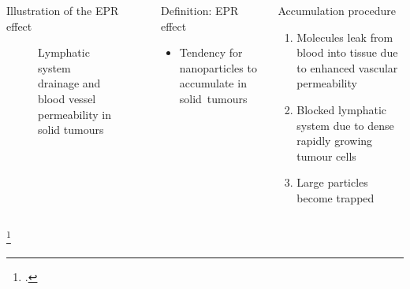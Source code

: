 \documentclass[aspectratio=169,compress]{beamer}
\newcommand*{\autotitle}{\subsecname\hfill\textbf{\small\secname}}
\begin{document}
\begin{frame}[fragile]{\autotitle}
\begin{columns}
\begin{block}{Illustration of the EPR effect}
\begin{figure}
          \caption{\textcolor{gold-palatinate}{Lymphatic system} drainage and \textcolor{red!80}{blood vessel} permeability in solid tumours}
        \end{figure}
      \end{block}

      \begin{block}{Definition: EPR effect}
        \begin{itemize}
          \item Tendency for nanoparticles to accumulate in \alert{solid~tumours}~
        \end{itemize}
      \end{block}

      \begin{block}{Accumulation procedure}
        \begin{enumerate}
          \item Molecules leak from blood into tissue due to \alert{enhanced vascular permeability}
          \item \alert{Blocked lymphatic system} due to dense rapidly growing tumour cells~
          \item Large particles become trapped
        \end{enumerate}
      \end{block}

  \end{columns}
  \footcitetext{maeda2000tumor,wicki2015nanomedicine,padera2004pathology}
\end{frame}
\end{document}
